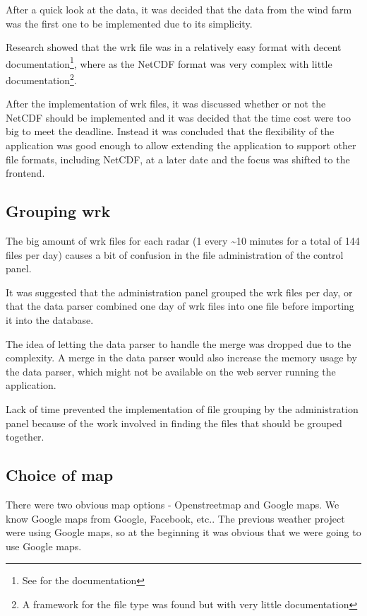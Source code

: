 After a quick look at the data, it was decided that the data from the wind farm was the first one to be implemented due to its simplicity.

Research showed that the wrk file was in a relatively easy format with decent documentation\footnote{See \cite{VRIS} for the documentation}, where as the NetCDF format was very complex with little documentation\footnote{A framework for the file type was found but with very little documentation}.

After the implementation of wrk files, it was discussed whether or not the NetCDF should be implemented and it was decided that the time cost were too big to meet the deadline. Instead it was concluded that the flexibility of the application was good enough to allow extending the application to support other file formats, including NetCDF, at a later date and the focus was shifted to the frontend.

\subsection{Grouping wrk}
The big amount of wrk files for each radar (1 every \textasciitilde 10 minutes for a total of 144 files per day) causes a bit of confusion in the file administration of the control panel.

It was suggested that the administration panel grouped the wrk files per day, or that the data parser combined one day of wrk files into one file before importing it into the database.

The idea of letting the data parser to handle the merge was dropped due to the complexity. A merge in the data parser would also increase the memory usage by the data parser, which might not be available on the web server running the application.

Lack of time prevented the implementation of file grouping by the administration panel because of the work involved in finding the files that should be grouped together.

\subsection{Choice of map}
There were two obvious map options - Openstreetmap and Google maps. We know Google maps from Google, Facebook, etc.. The previous weather project were using Google maps, so at the beginning it was obvious that we were going to use Google maps.

